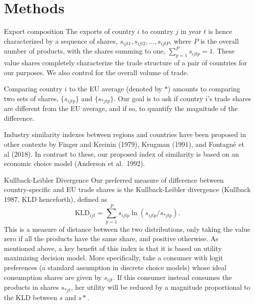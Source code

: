 \documentclass[
  ignorenonframetext,
  aspectratio=16,
]{beamer}
\begin{document}
\hypertarget{methods}{%
\section{Methods}\label{methods}}

\begin{frame}{Export composition}
\protect\hypertarget{export-composition}{}
The exports of country \(i\) to country \(j\) in year \(t\) is hence
characterized by a sequence of shares,
\(s_{ijt1}, s_{ijt2}, ..., s_{ijtP}\), where \(P\) is the overall number
of products, with the shares summing to one,
\(\sum_{p=1}^P s_{ijtp}=1\). These value shares completely characterize
the trade structure of a pair of countries for our purposes. We also
control for the overall volume of trade.

Comparing country \(i\) to the EU average (denoted by \(*\)) amounts to
comparing two sets of shares, \(\{s_{ijtp}\}\) and \(\{s_{*jtp}\}\). Our
goal is to ask if country \(i\)'s trade shares are different from the EU
average, and if so, to quantify the magnitude of the difference.

Industry similarity indexes between regions and countries have been
proposed in other contexts by Finger and Kreinin (1979), Krugman (1991),
and Fontagné et al (2018). In contrast to these, our proposed index of
similarity is based on an economic choice model (Anderson et al.~1992).
\end{frame}

\begin{frame}{Kullback-Leibler Divergence}
\protect\hypertarget{kullback-leibler-divergence}{}
Our preferred measure of difference between country-specific and EU
trade shares is the Kullback-Leibler divergence (Kullback 1987, KLD
henceforth), defined as \begin{equation}
    \text{KLD}_{ijt} =
    \sum_{p=1}^P
        s_{ijtp}
        \ln(s_{ijtp} / s_{*jtp}).
\end{equation} This is a measure of distance between the two
distributions, only taking the value zero if all the products have the
same share, and positive otherwise. As mentioned above, a key benefit of
this index is that it is based on utility maximizing decision model.
More specifically, take a consumer with logit preferences (a standard
assumption in discrete choice models) whose ideal consumption shares are
given by \(s_{ijt}\). If this consumer instead consumes the products in
shares \(s_{*jt}\), her utility will be reduced by a magnitude
proportional to the KLD between \(s\) and \(s*\).
\end{frame}
\end{document}
